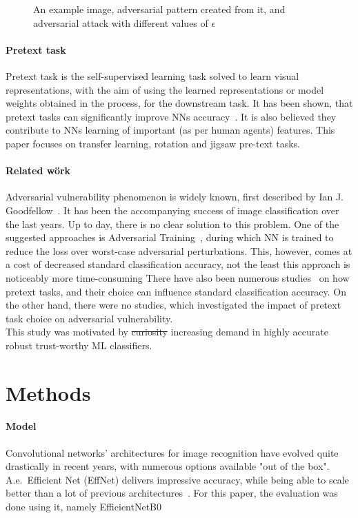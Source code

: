 \begin{figure}[h]
    \caption{An example image, adversarial pattern created from it, and adversarial attack with different values of $\epsilon$}
    \label{fig:fig-adv}
\end{figure}

\paragraph{Pretext task}
Pretext task is the self-supervised learning task solved to learn visual representations,
with the aim of using the learned representations or model weights obtained in the process, for the downstream task.
It has been shown, that pretext tasks can significantly improve NNs accuracy~\cite{kolesnikov2019revisiting}.
It is also believed they contribute to NNs learning of important (as per human agents) features.
This paper focuses on transfer learning, rotation and jigsaw pre-text tasks.


\paragraph{Related wörk}
Adversarial vulnerability phenomenon is widely known, first described by Ian J. Goodfellow~\cite{goodfellow2015explaining}.
It has been the accompanying success of image classification over the last years.
Up to day, there is no clear solution to this problem.
One of the suggested approaches is Adversarial Training~\cite{https://doi.org/10.48550/arxiv.1805.12152},
during which NN is trained to reduce the loss over worst-case adversarial perturbations.
This, however, comes at a cost of decreased standard classification accuracy, not the least this approach is noticeably more time-consuming
There have also been numerous studies~\cite{kolesnikov2019revisiting,DBLP:journals/corr/NorooziF16,DBLP:journals/corr/abs-1912-01991}
on how pretext tasks, and their choice can influence standard classification accuracy.
On the other hand, there were no studies, which investigated the impact of pretext task choice on
adversarial vulnerability. \\
This study was motivated by \st{curiosity} increasing demand in highly accurate robust trust-worthy ML classifiers.



\section{Methods}

\paragraph{Model}
Convolutional networks' architectures for image recognition have evolved quite drastically in recent years,
with numerous options available "out of the box".
A.e.\ Efficient Net (EffNet) delivers impressive accuracy, while being able to scale better than a lot of
previous architectures~\cite{DBLP:journals/corr/abs-1905-11946}.
For this paper, the evaluation was done using it, namely EfficientNetB0~\cite{KerasEffNet}

